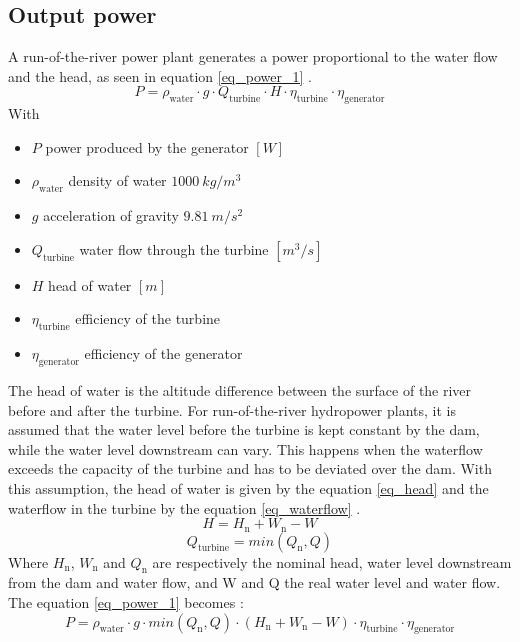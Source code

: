 \subsection{Output power}
A run-of-the-river power plant generates a power proportional to the water flow and the head, as seen in equation \ref{eq_power_1} \cite{quaschning}.
\begin{equation}
\label{eq_power_1} 
 P = \rho_\mathrm{water} \cdot g \cdot Q_\mathrm{turbine} \cdot H \cdot \eta_\mathrm{turbine} \cdot \eta_\mathrm{generator}
\end{equation}
With 
\begin{itemize}
\itemsep0em 
 \item $P$ \tabto{4cm} power produced by the generator \tabto{12cm} $[W]$
 \item $\rho_\mathrm{water}$ \tabto{4cm} density of water \tabto{12cm} $1000 \ kg/m^3$
 \item $g$ \tabto{4cm} acceleration of gravity \tabto{12cm} $9.81 \ m/s^2$
 \item $Q_\mathrm{turbine}$ \tabto{4cm} water flow through the turbine \tabto{12cm} $[m^3/s]$
 \item $H$ \tabto{4cm} head of water \tabto{12cm} $[m]$
 \item $\eta_\mathrm{turbine}$ \tabto{4cm} efficiency of the turbine
 \item $\eta_\mathrm{generator}$ \tabto{4cm} efficiency of the generator
\end{itemize}


The head of water is the altitude difference between the surface of the river before and after the turbine. For run-of-the-river hydropower plants, it is assumed that the water level before the turbine is kept constant by the dam, while the water level downstream can vary. This happens when the waterflow exceeds the capacity of the turbine and has to be deviated over the dam. With this assumption, the head of water is given by the equation \ref{eq_head} and the waterflow in the turbine by the equation \ref{eq_waterflow} \cite{quaschning}.
\begin{equation}
\label{eq_head} 
 H = H_\mathrm{n} +W_\mathrm{n}-W
\end{equation}
\begin{equation}
\label{eq_waterflow} 
 Q_\mathrm{turbine} = min(Q_\mathrm{n},Q)
\end{equation}
Where $H_\mathrm{n}$, $W_\mathrm{n}$ and $Q_\mathrm{n}$ are respectively the nominal head, water level downstream from the dam and water flow, and W and Q the real water level and water flow.
\newline
The  equation \ref{eq_power_1} becomes :
\begin{equation}
 \label{eq_power_2} 
 P = \rho_\mathrm{water} \cdot g \cdot min(Q_\mathrm{n},Q) \cdot (H_\mathrm{n} +W_\mathrm{n}-W) \cdot \eta_\mathrm{turbine} \cdot \eta_\mathrm{generator}
\end{equation}

